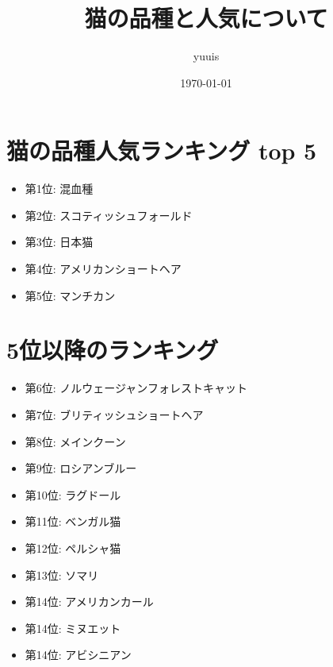 \documentclass[uplatex]{jsarticle}
\begin{document}
\title{\huge 猫の品種と人気について}
\author{yuuis}
\date{\today}
\maketitle

\section{猫の品種人気ランキング top 5}
    \begin{itemize}
        \item 第1位: 混血種
        \item 第2位: スコティッシュフォールド
        \item 第3位: 日本猫
        \item 第4位: アメリカンショートヘア
        \item 第5位: マンチカン
    \end{itemize}

\section{5位以降のランキング}
    \begin{itemize}
      \item 第6位: ノルウェージャンフォレストキャット
      \item 第7位: ブリティッシュショートヘア
      \item 第8位: メインクーン
      \item 第9位: ロシアンブルー
      \item 第10位: ラグドール
      \item 第11位: ベンガル猫
      \item 第12位: ペルシャ猫
      \item 第13位: ソマリ
      \item 第14位: アメリカンカール
      \item 第14位: ミヌエット
      \item 第14位: アビシニアン
    \end{itemize}
\end{document}
